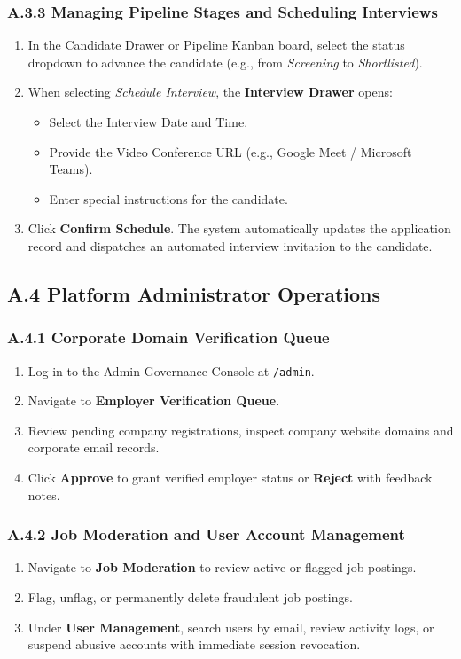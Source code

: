 \subsubsection{A.3.3 Managing Pipeline Stages and Scheduling Interviews}
\begin{enumerate}
    \item In the Candidate Drawer or Pipeline Kanban board, select the status dropdown to advance the candidate (e.g., from \textit{Screening} to \textit{Shortlisted}).
    \item When selecting \textit{Schedule Interview}, the \textbf{Interview Drawer} opens:
    \begin{itemize}
        \item Select the Interview Date and Time.
        \item Provide the Video Conference URL (e.g., Google Meet / Microsoft Teams).
        \item Enter special instructions for the candidate.
    \end{itemize}
    \item Click \textbf{Confirm Schedule}. The system automatically updates the application record and dispatches an automated interview invitation to the candidate.
\end{enumerate}

\subsection{A.4 Platform Administrator Operations}
\subsubsection{A.4.1 Corporate Domain Verification Queue}
\begin{enumerate}
    \item Log in to the Admin Governance Console at \texttt{/admin}.
    \item Navigate to \textbf{Employer Verification Queue}.
    \item Review pending company registrations, inspect company website domains and corporate email records.
    \item Click \textbf{Approve} to grant verified employer status or \textbf{Reject} with feedback notes.
\end{enumerate}

\subsubsection{A.4.2 Job Moderation and User Account Management}
\begin{enumerate}
    \item Navigate to \textbf{Job Moderation} to review active or flagged job postings.
    \item Flag, unflag, or permanently delete fraudulent job postings.
    \item Under \textbf{User Management}, search users by email, review activity logs, or suspend abusive accounts with immediate session revocation.
\end{enumerate}

